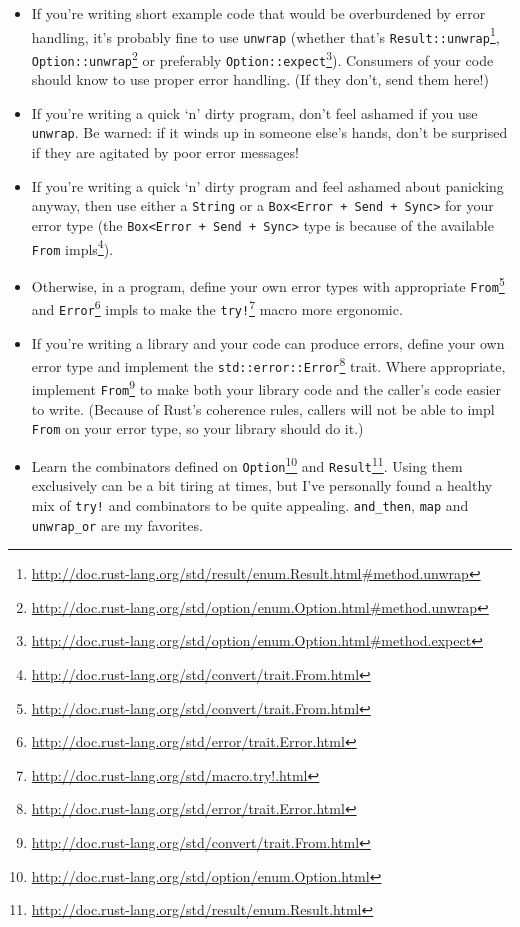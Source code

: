 \documentclass[a4paper,]{book}
\renewcommand{\href}[2]{#2\footnote{\url{#1}}}
\providecommand{\tightlist}{%
  \setlength{\itemsep}{0pt}\setlength{\parskip}{0pt}}
\begin{document}
\begin{itemize}
\tightlist
\item
  If you're writing short example code that would be overburdened by
  error handling, it's probably fine to use \texttt{unwrap} (whether
  that's
  \href{http://doc.rust-lang.org/std/result/enum.Result.html\#method.unwrap}{\texttt{Result::unwrap}},
  \href{http://doc.rust-lang.org/std/option/enum.Option.html\#method.unwrap}{\texttt{Option::unwrap}}
  or preferably
  \href{http://doc.rust-lang.org/std/option/enum.Option.html\#method.expect}{\texttt{Option::expect}}).
  Consumers of your code should know to use proper error handling. (If
  they don't, send them here!)
\item
  If you're writing a quick `n' dirty program, don't feel ashamed if you
  use \texttt{unwrap}. Be warned: if it winds up in someone else's
  hands, don't be surprised if they are agitated by poor error messages!
\item
  If you're writing a quick `n' dirty program and feel ashamed about
  panicking anyway, then use either a \texttt{String} or a
  \texttt{Box\textless{}Error\ +\ Send\ +\ Sync\textgreater{}} for your
  error type (the
  \texttt{Box\textless{}Error\ +\ Send\ +\ Sync\textgreater{}} type is
  because of the
  \href{http://doc.rust-lang.org/std/convert/trait.From.html}{available
  \texttt{From} impls}).
\item
  Otherwise, in a program, define your own error types with appropriate
  \href{http://doc.rust-lang.org/std/convert/trait.From.html}{\texttt{From}}
  and
  \href{http://doc.rust-lang.org/std/error/trait.Error.html}{\texttt{Error}}
  impls to make the
  \href{http://doc.rust-lang.org/std/macro.try!.html}{\texttt{try!}}
  macro more ergonomic.
\item
  If you're writing a library and your code can produce errors, define
  your own error type and implement the
  \href{http://doc.rust-lang.org/std/error/trait.Error.html}{\texttt{std::error::Error}}
  trait. Where appropriate, implement
  \href{http://doc.rust-lang.org/std/convert/trait.From.html}{\texttt{From}}
  to make both your library code and the caller's code easier to write.
  (Because of Rust's coherence rules, callers will not be able to impl
  \texttt{From} on your error type, so your library should do it.)
\item
  Learn the combinators defined on
  \href{http://doc.rust-lang.org/std/option/enum.Option.html}{\texttt{Option}}
  and
  \href{http://doc.rust-lang.org/std/result/enum.Result.html}{\texttt{Result}}.
  Using them exclusively can be a bit tiring at times, but I've
  personally found a healthy mix of \texttt{try!} and combinators to be
  quite appealing. \texttt{and\_then}, \texttt{map} and
  \texttt{unwrap\_or} are my favorites.
\end{itemize}
\end{document}
